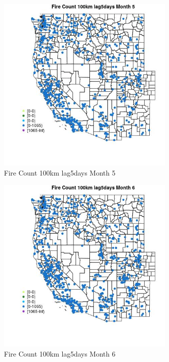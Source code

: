 \begin{figure} 
\centering  
\includegraphics[width=0.77\textwidth]{Code_Outputs/Report_ML_input_PM25_Step4_part_f_de_duplicated_aveswNAs_MapObsMo5Fire_Count_100km_lag5days.jpg} 
\caption{\label{fig:Report_ML_input_PM25_Step4_part_f_de_duplicated_aveswNAsMapObsMo5Fire_Count_100km_lag5days}Fire Count 100km lag5days Month 5} 
\end{figure} 
 

\begin{figure} 
\centering  
\includegraphics[width=0.77\textwidth]{Code_Outputs/Report_ML_input_PM25_Step4_part_f_de_duplicated_aveswNAs_MapObsMo6Fire_Count_100km_lag5days.jpg} 
\caption{\label{fig:Report_ML_input_PM25_Step4_part_f_de_duplicated_aveswNAsMapObsMo6Fire_Count_100km_lag5days}Fire Count 100km lag5days Month 6} 
\end{figure} 
 

